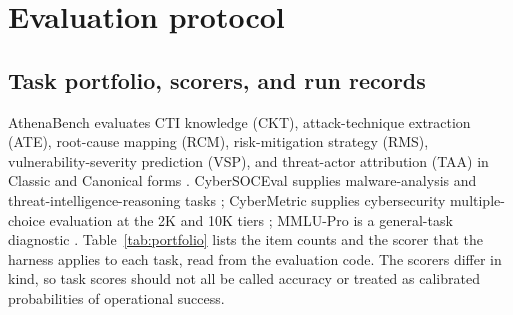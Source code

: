 \documentclass[preprint,12pt,authoryear]{elsarticle}
\begin{document}
\section{Evaluation protocol}\label{sec:evaluation}
\subsection{Task portfolio, scorers, and run records}
AthenaBench evaluates CTI knowledge (CKT), attack-technique extraction (ATE), root-cause mapping (RCM), risk-mitigation strategy (RMS), vulnerability-severity prediction (VSP), and threat-actor attribution (TAA) in Classic and Canonical forms \citep{alam2025athenabench}. CyberSOCEval supplies malware-analysis and threat-intelligence-reasoning tasks \citep{deason2025cybersoceval}; CyberMetric supplies cybersecurity multiple-choice evaluation at the 2K and 10K tiers \citep{tihanyi2024cybermetric}; MMLU-Pro is a general-task diagnostic \citep{wang2024mmlupro}. Table~\ref{tab:portfolio} lists the item counts and the scorer that the harness applies to each task, read from the evaluation code. The scorers differ in kind, so task scores should not all be called accuracy or treated as calibrated probabilities of operational success.
\end{document}
